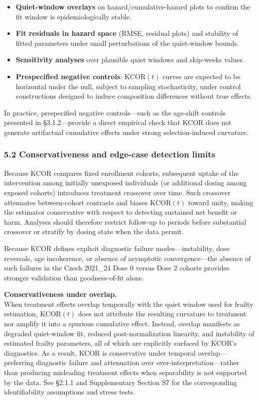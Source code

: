 \documentclass[
]{article}
\providecommand{\tightlist}{%
  \setlength{\itemsep}{0pt}\setlength{\parskip}{0pt}}
\begin{document}
\begin{itemize}
\tightlist
\item
  \textbf{Quiet-window overlays} on hazard/cumulative-hazard plots to
  confirm the fit window is epidemiologically stable.
\item
  \textbf{Fit residuals in hazard space} (RMSE, residual plots) and
  stability of fitted parameters under small perturbations of the
  quiet-window bounds.
\item
  \textbf{Sensitivity analyses} over plausible quiet windows and
  skip-weeks values.
\item
  \textbf{Prespecified negative controls}: \(\mathrm{KCOR}(t)\) curves
  are expected to be horizontal under the null, subject to sampling
  stochasticity, under control constructions designed to induce
  composition differences without true effects.
\end{itemize}

In practice, prespecified negative controls---such as the age-shift
controls presented in §3.1.2---provide a direct empirical check that
KCOR does not generate artifactual cumulative effects under strong
selection-induced curvature.

\subsubsection{5.2 Conservativeness and edge-case detection
limits}\label{conservativeness-and-edge-case-detection-limits}

Because KCOR compares fixed enrollment cohorts, subsequent uptake of the
intervention among initially unexposed individuals (or additional dosing
among exposed cohorts) introduces treatment crossover over time. Such
crossover attenuates between-cohort contrasts and biases
\(\mathrm{KCOR}(t)\) toward unity, making the estimator conservative
with respect to detecting sustained net benefit or harm. Analyses should
therefore restrict follow-up to periods before substantial crossover or
stratify by dosing state when the data permit.

Because KCOR defines explicit diagnostic failure modes---instability,
dose reversals, age incoherence, or absence of asymptotic
convergence---the absence of such failures in the Czech 2021\_24 Dose 0
versus Dose 2 cohorts provides stronger validation than goodness-of-fit
alone.

\textbf{Conservativeness under overlap.}\\
When treatment effects overlap temporally with the quiet window used for
frailty estimation, \(\mathrm{KCOR}(t)\) does not attribute the
resulting curvature to treatment nor amplify it into a spurious
cumulative effect. Instead, overlap manifests as degraded quiet-window
fit, reduced post-normalization linearity, and instability of estimated
frailty parameters, all of which are explicitly surfaced by KCOR's
diagnostics. As a result, KCOR is conservative under temporal
overlap---preferring diagnostic failure and attenuation over
over-interpretation---rather than producing misleading treatment effects
when separability is not supported by the data. See §2.1.1 and
Supplementary Section S7 for the corresponding identifiability
assumptions and stress tests.
\end{document}
